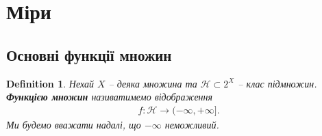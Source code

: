 \documentclass[a4paper, 10pt]{article}
\theoremstyle{theoremdd}
\newtheorem{definition}[theorem]{Definition}
\begin{document}
\section{Міри}
\subsection{Основні функції множин}
\begin{definition}
Нехай $X$ -- деяка множина та $\mathcal{H} \subset 2^X$ -- клас підмножин.\\
\textbf{Функцією множин} називатимемо відображення
\begin{align*}
f \colon \mathcal{H} \to (-\infty,+\infty].
\end{align*}
Ми будемо вважати надалі, що $-\infty$ неможливий.
\end{definition}
\end{document}
